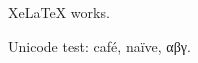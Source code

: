 \documentclass{article}
\begin{document}
XeLaTeX works.

Unicode test: café, naïve, αβγ.
\end{document}
